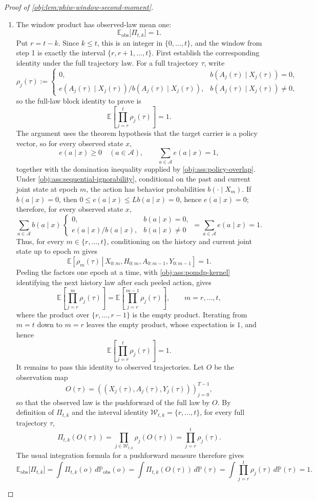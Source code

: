 \documentclass[11pt]{article}
\begin{document}
\begin{proof}[Proof of \cref{obj:lem:phiw-window-second-moment}]
\begin{enumerate}
\item
The window product has observed-law mean one:
\[
\mathbb E_{\mathrm{obs}}\bigl[\Pi_{t,k}\bigr]=1.
\]
Put \(r=t-k\). Since \(k\le t\), this is an integer in \(\{0,\ldots,t\}\), and the window from step 1 is exactly the interval \(\{r,r+1,\ldots,t\}\). First establish the corresponding identity under the full trajectory law. For a full trajectory \(\tau\), write
\[
\rho_j(\tau)
:=
\begin{cases}
0, & b(A_j(\tau)\mid X_j(\tau))=0,\\[1mm]
e(A_j(\tau)\mid X_j(\tau))/b(A_j(\tau)\mid X_j(\tau)),
& b(A_j(\tau)\mid X_j(\tau))\ne 0,
\end{cases}
\]
so the full-law block identity to prove is
\[
\mathbb E\!\left[\prod_{j=r}^{t}\rho_j(\tau)\right]=1.
\]
The argument uses the theorem hypothesis that the target carrier is a policy vector, so for every observed state \(x\),
\[
e(a\mid x)\ge 0\quad(a\in\mathcal A),
\qquad
\sum_{a\in\mathcal A}e(a\mid x)=1,
\]
together with the domination inequality supplied by \cref{obj:ass:policy-overlap}. Under \cref{obj:ass:sequential-ignorability}, conditional on the past and current joint state at epoch \(m\), the action has behavior probabilities \(b(\cdot\mid X_m)\). If \(b(a\mid x)=0\), then \(0\le e(a\mid x)\le Lb(a\mid x)=0\), hence \(e(a\mid x)=0\); therefore, for every observed state \(x\),
\[
\sum_{a\in\mathcal A} b(a\mid x)\,
\begin{cases}
0, & b(a\mid x)=0,\\[1mm]
e(a\mid x)/b(a\mid x), & b(a\mid x)\ne 0
\end{cases}
=
\sum_{a\in\mathcal A}e(a\mid x)=1.
\]
Thus, for every \(m\in\{r,\ldots,t\}\), conditioning on the history and current joint state up to epoch \(m\) gives
\[
\mathbb E\!\left[\left.\rho_m(\tau)\,\right|\,
X_{0:m},H_{0:m},A_{0:m-1},Y_{0:m-1}\right]=1.
\]
Peeling the factors one epoch at a time, with \cref{obj:ass:pomdp-kernel} identifying the next history law after each peeled action, gives
\[
\mathbb E\!\left[\prod_{j=r}^{m}\rho_j(\tau)\right]
=
\mathbb E\!\left[\prod_{j=r}^{m-1}\rho_j(\tau)\right],
\qquad m=r,\ldots,t,
\]
where the product over \(\{r,\ldots,r-1\}\) is the empty product. Iterating from \(m=t\) down to \(m=r\) leaves the empty product, whose expectation is \(1\), and hence
\[
\mathbb E\!\left[\prod_{j=r}^{t}\rho_j(\tau)\right]=1.
\]
It remains to pass this identity to observed trajectories. Let \(O\) be the observation map
\[
O(\tau)=((X_j(\tau),A_j(\tau),Y_j(\tau)))_{j=0}^{T-1},
\]
so that the observed law is the pushforward of the full law by \(O\). By definition of \(\Pi_{t,k}\) and the interval identity \(\mathcal W_{t,k}=\{r,
\ldots,t\}\), for every full trajectory \(\tau\),
\[
\Pi_{t,k}(O(\tau))
=
\prod_{j\in\mathcal W_{t,k}}\rho_j(O(\tau))
=
\prod_{j=r}^{t}\rho_j(\tau).
\]
The usual integration formula for a pushforward measure therefore gives
\[
\mathbb E_{\mathrm{obs}}\bigl[\Pi_{t,k}\bigr]
=
\int \Pi_{t,k}(o)\,d\mathbb P_{\mathrm{obs}}(o)
=
\int \Pi_{t,k}(O(\tau))\,d\mathbb P(\tau)
=
\int \prod_{j=r}^{t}\rho_j(\tau)\,d\mathbb P(\tau)
=1.
\]


\end{enumerate}
\end{proof}
\end{document}
